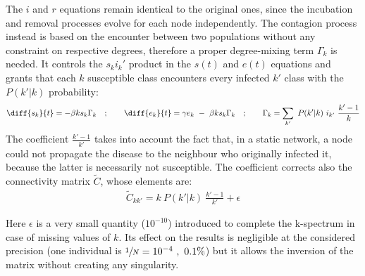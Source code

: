 \documentclass[DIV=12, BCOR=0pt]{scrartcl}  %
\begin{document}
  The $i$ and $r$ equations remain identical to the original ones, since the incubation and removal processes evolve for each node independently. The contagion process instead is based on the encounter between two populations without any constraint on respective degrees, therefore a proper degree-mixing term $\Gamma_k$ is needed. It controls the $s_k i_k'$ product in the $s(t)$ and $e(t)$ equations and grants that each $k$ susceptible class encounters every infected $k'$ class with the $P(k'|k)$ probability:
  \begin{align}
  	\diff{s_{k}}{t} = - \beta k s_{k} \Gamma_{k} \quad;  \qquad 	\diff{e_{k}}{t} =  \gamma e_{k} \ - \ \beta k s_{k} \Gamma_{k} \quad; \qquad	\Gamma_{k} = \sum_{k'} \ P(k'|k) \ i_{k'}  \ \frac{k' - 1}{k}
  	\label{eq:seir_dbmf}
  \end{align}
%  
  The coefficient $\frac{k' - 1}{k'}$ takes into account the fact that, in a static network, a node could not propagate the disease to the neighbour who originally infected it, because the latter is necessarily not susceptible. %
  The coefficient corrects also the connectivity matrix $\tilde{C}$, whose elements are:  
  \begin{align}
		\tilde{C}_{kk'} = k \ P(k'|k) \ \frac{k' - 1}{k'} + \epsilon
  \end{align}

	Here $\epsilon$ is a very small quantity ($10^{-10}$) introduced to complete the k-spectrum in case of missing values of $k$. Its effect on the results is negligible at the considered precision (one individual is $ \sfrac{1}{N} = 10^{-4} \ , \ 0.1 \%$) but it allows the inversion of the matrix without creating any singularity.
\end{document}
